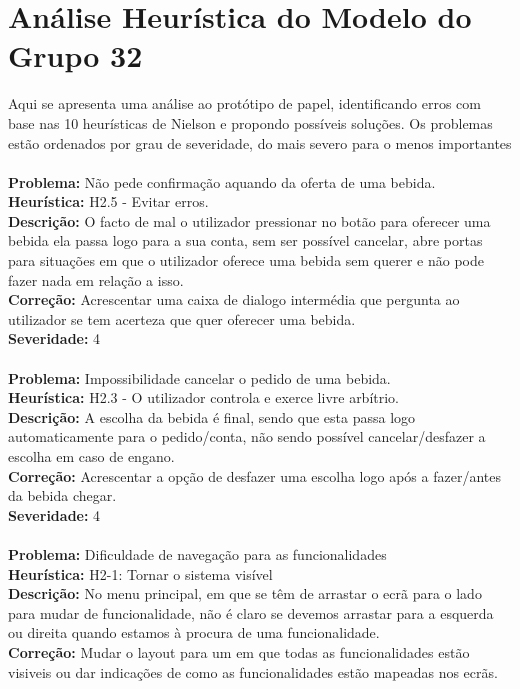 \documentclass{article}
\begin{document}
\section*{Análise Heurística do Modelo do Grupo 32}
Aqui se apresenta uma análise ao protótipo de papel, identificando erros com base nas 10 heurísticas de Nielson e propondo possíveis soluções. Os problemas estão ordenados por grau de severidade, do mais severo para o menos importantes\\
\\
\textbf{Problema:} Não pede confirmação aquando da oferta de uma bebida.\\
\textbf{Heurística:} H2.5 - Evitar erros.\\
\textbf{Descrição:} O facto de mal o utilizador pressionar no botão para oferecer uma bebida ela passa logo para a sua conta, sem ser possível cancelar, abre portas para situações em que o utilizador oferece uma bebida sem querer e não pode fazer nada em relação a isso.\\
\textbf{Correção:} Acrescentar uma caixa de dialogo intermédia que pergunta ao utilizador se tem acerteza que quer oferecer uma bebida.\\
\textbf{Severidade:} 4\\
\\
\textbf{Problema:} Impossibilidade cancelar o pedido de uma bebida.\\
\textbf{Heurística:} H2.3 - O utilizador controla e exerce livre arbítrio.\\
\textbf{Descrição:} A escolha da bebida é final, sendo que esta passa logo automaticamente para o pedido/conta, não sendo possível cancelar/desfazer a escolha em caso de engano.\\
\textbf{Correção:} Acrescentar a opção de desfazer uma escolha logo após a fazer/antes da bebida chegar.\\
\textbf{Severidade:} 4\\
\\
\textbf{Problema:} Dificuldade de navegação para as funcionalidades\\
\textbf{Heurística:} H2-1: Tornar o sistema visível\\
\textbf{Descrição:} No menu principal, em que se têm de arrastar o ecrã para o lado para mudar de funcionalidade, não é claro se devemos arrastar para a esquerda ou direita quando estamos à procura de uma funcionalidade.\\
\textbf{Correção:} Mudar o layout para um em que todas as funcionalidades estão visiveis ou dar indicações de como as funcionalidades estão mapeadas nos ecrãs.\\
\end{document}
